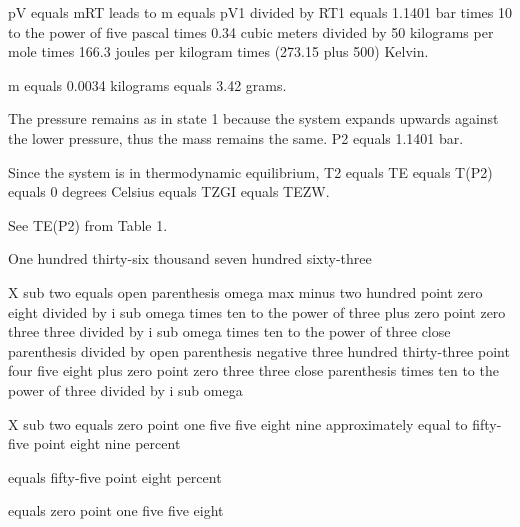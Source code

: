 pV equals mRT leads to m equals pV1 divided by RT1 equals 1.1401 bar times 10 to the power of five pascal times 0.34 cubic meters divided by 50 kilograms per mole times 166.3 joules per kilogram times (273.15 plus 500) Kelvin.

m equals 0.0034 kilograms equals 3.42 grams.

The pressure remains as in state 1 because the system expands upwards against the lower pressure, thus the mass remains the same. P2 equals 1.1401 bar.

Since the system is in thermodynamic equilibrium, T2 equals TE equals T(P2) equals 0 degrees Celsius equals TZGI equals TEZW.

See TE(P2) from Table 1.

One hundred thirty-six thousand seven hundred sixty-three

X sub two equals open parenthesis omega max minus two hundred point zero eight divided by i sub omega times ten to the power of three plus zero point zero three three divided by i sub omega times ten to the power of three close parenthesis divided by open parenthesis negative three hundred thirty-three point four five eight plus zero point zero three three close parenthesis times ten to the power of three divided by i sub omega

X sub two equals zero point one five five eight nine approximately equal to fifty-five point eight nine percent

equals fifty-five point eight percent

equals zero point one five five eight